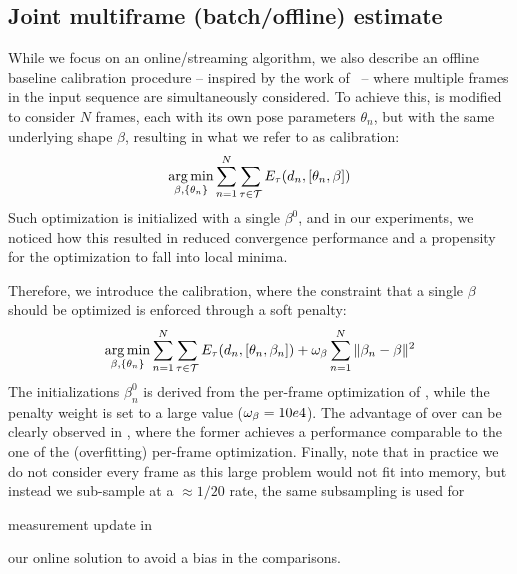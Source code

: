 

\subsection{Joint multiframe (batch/offline) estimate}
\label{sec:batch}
\label{sec:offline}
While we focus on an online/streaming algorithm, we also describe an offline baseline calibration procedure -- inspired by the work of~\cite{taylor2014user} -- where multiple frames in the input sequence are simultaneously considered. To achieve this,  is modified to consider $N$ frames, each with its own pose parameters $\theta_n$, but with the same underlying shape $\beta$, resulting in what we refer to as \emph{\OfflineHard{}} calibration:
% 
\begin{equation}
\operatorname*{arg\,min}_{\beta, \{\theta_n\} } \sum_{n=1}^N \sum_{\tau \in \mathcal{T}} E_{\tau}(d_n, [\theta_n, \beta]) 
\label{eq:offlinehard}
\end{equation}
% 
Such optimization is initialized with a single $\beta^0$, and in our experiments, we noticed how this resulted in reduced convergence performance and a propensity for the optimization to fall into local minima. 

Therefore, we introduce the \emph{\OfflineSoft{}} calibration, where the constraint that a single $\beta$ should be optimized is enforced through a soft penalty:
% 
\begin{equation}
\operatorname*{arg\,min}_{\beta, \{\theta_n\} } \sum_{n=1}^N \sum_{\tau \in \mathcal{T}} E_{\tau}(d_n, [\theta_n, \beta_n]) + \omega_{\beta} \sum_{n=1}^N \| \beta_n - \beta \|^2
\label{eq:offlinesoft}
\end{equation}
%
The initializations $\beta_n^0$ is derived from the per-frame optimization of , while the penalty weight is set to a large value ($\small \omega_{\beta}=10e4$). The advantage of \OfflineSoft{} over \OfflineHard{} can be clearly observed in , where the former achieves a performance comparable to the one of the (overfitting) per-frame optimization. Finally, note that in practice we do not consider every frame as this large problem would not fit into memory, but instead we sub-sample at a $\approx 1/20$ rate, the same subsampling is used for \begin{edit} measurement update in \end{edit}our online solution to avoid a bias in the comparisons. 

